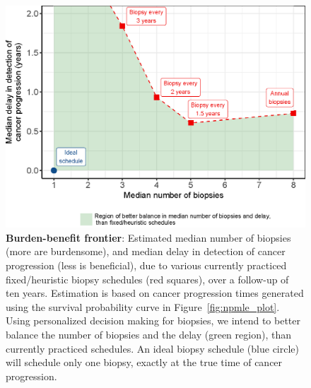 \begin{figure}[!htb]
\captionsetup{justification=justified}
\centerline{\includegraphics[width=\columnwidth]{images/better_balance_intro.eps}}
\caption{\textbf{Burden-benefit frontier}: Estimated median number of biopsies (more are burdensome), and median delay in detection of cancer progression (less is beneficial), due to various currently practiced fixed/heuristic biopsy schedules (red squares), over a follow-up of ten years. Estimation is based on cancer progression times generated using the survival probability curve in Figure~\ref{fig:npmle_plot}. Using personalized decision making for biopsies, we intend to better balance the number of biopsies and the delay (green region), than currently practiced schedules. An ideal biopsy schedule (blue circle) will schedule only one biopsy, exactly at the true time of cancer progression.}
\label{fig:better_balance_intro}
\end{figure}

